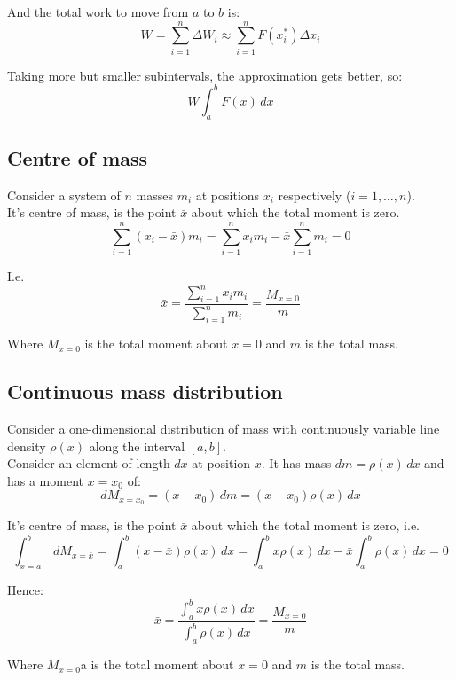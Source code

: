 \documentclass[11pt]{article}
\begin{document}
And the total work to move from \(a\) to \(b\) is:
\[W = \sum_{i = 1}^n \Delta W_i \approx \sum_{i = 1}^n F(x_i^*) \Delta x_i\]

Taking more but smaller subintervals, the approximation gets better, so:
\[W \int_a^b F(x) \, dx\]

\newpage

\subsection{Centre of mass}
\label{sec:orgc9d5e0c}
Consider a system of \(n\) masses \(m_i\) at positions \(x_i\) respectively (\(i = 1, \ldots, n\)).
\\[0pt]

It's centre of mass, is the point \(\bar{x}\) about which the total moment is zero.
\[\sum_{i = 1}^n (x_i - \bar{x})m_i = \sum_{i = 1}^n x_i m_i - \bar{x} \sum_{i = 1}^n m_i = 0\]

I.e.
\[\bar{x} = \frac{\sum_{i = 1}^n x_i m_i}{\sum_{i = 1}^n m_i} = \frac{M_{x = 0}}{m}\]

Where \(M_{x = 0}\) is the total moment about \(x = 0\) and \(m\) is the total mass.

\subsection{Continuous mass distribution}
\label{sec:org77b12d5}
Consider a one-dimensional distribution of mass with continuously variable line density \(\rho(x)\) along the interval \([a, b]\).
\\[0pt]

Consider an element of length \(dx\) at position \(x\). It has mass \(dm = \rho(x) \, dx\) and has a moment \(x = x_0\) of:
\[dM_{x = x_0} = (x - x_0) \, dm = (x - x_0) \rho(x) \, dx\]

It's centre of mass, is the point \(\bar{x}\) about which the total moment is zero, i.e.
\[\int_{x = a}^b \, dM_{x = \bar{x}} = \int_a^b (x - \bar{x}) \rho (x) \, dx = \int_a^b x \rho (x) \, dx - \bar{x} \int_a^b \rho(x) \, dx = 0\]

Hence:
\[\bar{x} = \frac{\int_a^b x \rho(x) \, dx}{\int_a^b \rho(x) \, dx} = \frac{M_{x = 0}}{m}\]

Where \(M_{x = 0}\)a is the total moment about \(x = 0\) and \(m\) is the total mass.
\end{document}
